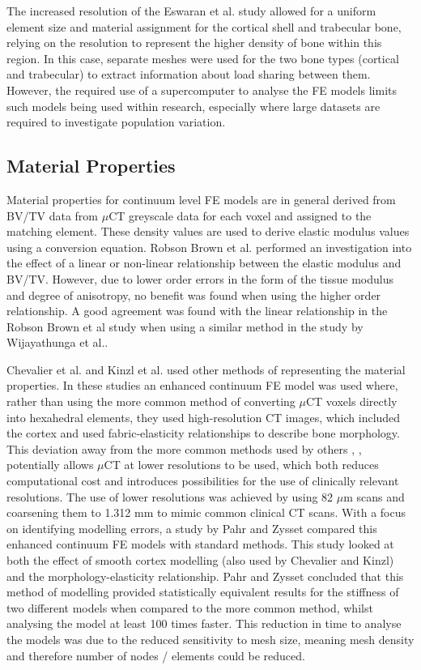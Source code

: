 The increased resolution of the Eswaran et al. \cite{Eswaran2007} study allowed
for a uniform element size and material assignment for the cortical
shell and trabecular bone, relying on the resolution to represent the
higher density of bone within this region. In this case, separate meshes
were used for the two bone types (cortical and trabecular) to extract
information about load sharing between them. However, the required use
of a supercomputer to analyse the FE models limits such models being
used within research, especially where large datasets are required to
investigate population variation.

\subsection{Material Properties}\label{material-properties}

Material properties for continuum level FE models are in general derived
from BV/TV data from $\mu$CT greyscale data for each voxel and assigned to
the matching element. These density values are used to derive elastic
modulus values using a conversion equation. Robson Brown et al.
\cite{RobsonBrown2014}
performed an investigation into the effect of a linear or non-linear
relationship between the elastic modulus and BV/TV. However, due to
lower order errors in the form of the tissue modulus and degree of anisotropy, no benefit
was found when using the higher order relationship. A good
agreement was found with the linear relationship in the Robson Brown
et al study when using a similar method in the study by Wijayathunga et
al.\cite{Wijayathunga2008}.

Chevalier et al. \cite{Chevalier2009} and Kinzl et al. \cite{Kinzl2012} used
other
methods
of representing the material properties. In these studies an enhanced
continuum FE model was used where, rather than using the more common
method of converting $\mu$CT voxels directly into hexahedral elements, they
used high-resolution CT images, which included the cortex and used
fabric-elasticity relationships to describe bone morphology. This
deviation away from the more common methods used by others
\cite{RobsonBrown2014},
\cite{Wijayathunga2008}, potentially allows $\mu$CT at lower resolutions to be
used, which
both reduces computational cost and introduces possibilities for the use
of clinically relevant resolutions. The use of lower resolutions was achieved by using 82 $\mu$m scans and coarsening them to 1.312 mm to mimic common clinical CT
scans. With a focus on identifying modelling errors, a study by Pahr and
Zysset \cite{Pahr2009} compared this enhanced continuum FE models with
standard methods. This study looked at both the effect of smooth cortex
modelling (also used by Chevalier and Kinzl) and the
morphology-elasticity relationship. Pahr and Zysset concluded that this
method of modelling provided statistically equivalent results for the
stiffness of two different models when compared to the more common
method, whilst analysing the model at least 100 times faster.
This reduction in time to analyse the models was due to the reduced sensitivity to mesh size, meaning
mesh density and therefore number of nodes / elements could be reduced.

